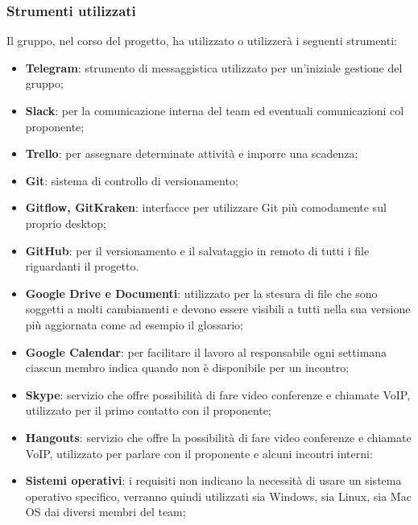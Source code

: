 		\subsubsection{Strumenti utilizzati}
		Il gruppo, nel corso del progetto, ha utilizzato o utilizzerà i seguenti strumenti:
		\begin{itemize}
			\item \textbf{Telegram}: strumento di messaggistica utilizzato per un'iniziale gestione del gruppo;
			\item \textbf{Slack}: per la comunicazione interna del team ed eventuali comunicazioni col proponente;
			\item \textbf{Trello}: per assegnare determinate attività e imporre una scadenza;
			\item \textbf{Git}: sistema di controllo di versionamento;
			\item \textbf{Gitflow, GitKraken}: interfacce per utilizzare Git più comodamente sul proprio desktop;
			\item \textbf{GitHub}: per il versionamento e il salvataggio in remoto di tutti i file riguardanti il progetto.
			\item \textbf{Google Drive e Documenti}: utilizzato per la stesura di file che sono soggetti a molti cambiamenti e devono essere visibili a tutti nella sua versione più aggiornata come ad esempio il glossario;
			\item \textbf{Google Calendar}: per facilitare il lavoro al responsabile ogni settimana ciascun membro indica quando non è disponibile per un incontro;
			\item \textbf{Skype}: servizio che offre possibilità di fare video conferenze e chiamate VoIP, utilizzato per il primo contatto con il proponente;
			\item \textbf{Hangouts}: servizio che offre la possibilità di fare video conferenze e chiamate VoIP, utilizzato per parlare con il proponente e alcuni incontri interni:
			\item \textbf{Sistemi operativi}: i requisiti non indicano la necessità di usare un sistema operativo specifico, verranno quindi utilizzati sia Windows, sia Linux, sia Mac OS dai diversi membri del team; %
		\end{itemize}
	